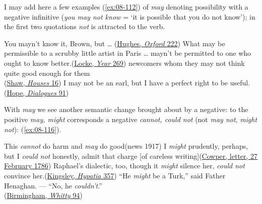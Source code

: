 I may add here a few examples (\ref{ex:08-112}) of \textit{may} denoting possibility with a negative infinitive (\textit{you may not know} = `it is possible that you do not know'); in the first two quotations \textit{not} is attracted to the verb.

\ea \label{ex:08-112}
\ea
You mayn't know it, Brown, but {\dots} \hfill(\href{https://archive.org/details/tombrownatoxford00hughiala/page/228/mode/2up?q=%22you+mayn%27t+know+it%22&view=theater}{Hughes, \textit{Oxford} 222}) %
\ex
What may be permissible to a scrubby little artist in Paris {\dots} mayn't be permitted to one who ought to know better.\hfill(\href{https://archive.org/details/wonderfulyear00lockuoft/page/284/mode/2up?q=%22scrubby+little+artist%22&view=theater}{Locke, \textit{Year} 269}) %
\ex
newcomers whom they may not think quite good enough for them\\\hfill(\href{https://archive.org/details/widowershousesun00shaw/page/16/mode/2up?q=%22newcomers+whom%22&view=theater}{Shaw, \textit{Houses} 16})
\ex
I may not be an earl, but I have a perfect right to be useful.\\\hfill(\href{https://archive.org/details/dollydialogues00hope_0/page/146/mode/2up?view=theater&q=%22be+an+earl%22}{Hope, \textit{Dialogues} 91})
\z
\z

With \textit{may} we see another semantic change brought about by a negative: to the positive \textit{may, might} corresponds a negative \textit{cannot, could not} (not \textit{may not}, \textit{might not}): (\ref{ex:08-116}).

\ea \label{ex:08-116}
\ea
This \emph{cannot} do harm and \emph{may} do good\hfill(news 1917) %
\ex
I \emph{might} prudently, perhaps, but I \emph{could not} honestly, admit that charge [of careless writing]\hfill(\href{https://books.google.co.jp/books?id=gfRCAQAAMAAJ&pg=PA282&lpg=PA282&dq=%22I+might+prudently,+perhaps%22&source=bl&ots=5oIe7EGS_S&sig=ACfU3U0B7_Bz74gbktWEgeDnRsYs6tHXGg&hl=en&sa=X&ved=2ahUKEwjhw4jKtN6FAxVwl1YBHd8NBbcQ6AF6BAgJEAM#v=onepage&q=%22I%20might%20prudently%2C%20perhaps%22&f=false}{Cowper, letter, 27 February 1786})
\ex
Raphael's dialectic, too, though it \emph{might} silence her, \emph{could not} convince her.\hfill(\href{https://archive.org/details/hypatia00kinggoog/page/n442/mode/2up?q=%22might+silence+her%22&view=theater}{Kingsley, \textit{Hypatia} 357}) %
\ex
``He \emph{might} be a Turk,'' said Father Henaghan. --- ``No, he \emph{couldn't}.''\\\hfill(\href{https://archive.org/details/advofdrwhitty00birmiala/page/94/mode/2up?q=%22he+might+be+a+turk%22&view=theater}{Birmingham, \textit{Whitty} 94}) %
\z
\z
{}
